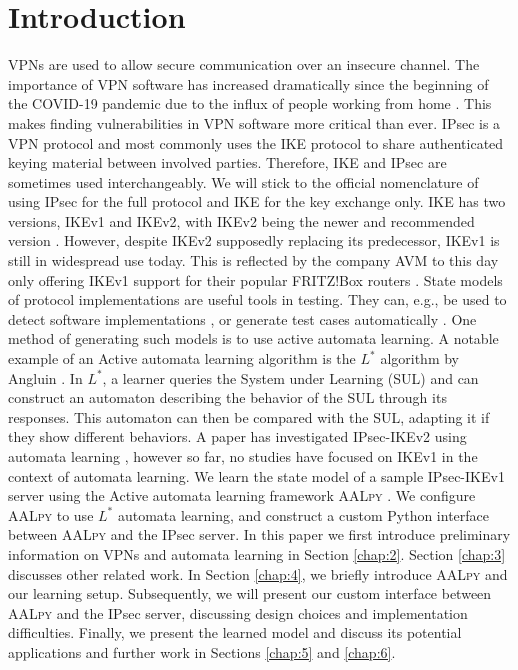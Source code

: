 \documentclass[runningheads]{llncs}
\begin{document}
\section{Introduction}
VPNs are used to allow secure communication over an insecure channel. The importance of VPN software has increased dramatically since the beginning of the COVID-19 pandemic due to the influx of people working from home \cite{abhijith2020impact}. This makes finding vulnerabilities in VPN software more critical than ever. IPsec is a VPN protocol and most commonly uses the IKE protocol to share authenticated keying material between involved parties. Therefore, IKE and IPsec are sometimes used interchangeably. We will stick to the official nomenclature of using IPsec for the full protocol and IKE for the key exchange only. IKE has two versions, IKEv1 and IKEv2, with IKEv2 being the newer and recommended version \cite{nist791491}. However, despite IKEv2 supposedly replacing its predecessor, IKEv1 is still in widespread use today. This is reflected by the company AVM to this day only offering IKEv1 support for their popular FRITZ!Box routers \cite{avm2022}.
State models of protocol implementations are useful tools in testing. They can, e.g., be used to detect software implementations \cite{pferscher2021fingerprinting}, or generate test cases automatically \cite{pferscher2022fuzzing}. One method of generating such models is to use active automata learning. A notable example of an Active automata learning algorithm is the $L^*$ algorithm by Angluin \cite{angluin1987learning}. In $L^*$, a learner queries the System under Learning (SUL) and can construct an automaton describing the behavior of the SUL through its responses. This automaton can then be compared with the SUL, adapting it if they show different behaviors. A paper has investigated IPsec-IKEv2 using automata learning \cite{guo2019model}, however so far, no studies have focused on IKEv1 in the context of automata learning. 
We learn the state model of a sample IPsec-IKEv1 server using the Active automata learning framework \textsc{AALpy} \cite{muvskardin2022AALpy}. We configure \textsc{AALpy} to use $L^*$ automata learning, and construct a custom Python interface between \textsc{AALpy} and the IPsec server.
In this paper we first introduce preliminary information on VPNs and automata learning in Section \ref{chap:2}. Section \ref{chap:3} discusses other related work. In Section \ref{chap:4}, we briefly introduce \textsc{AALpy} and our learning setup. Subsequently, we will present our custom interface between \textsc{AALpy} and the IPsec server, discussing design choices and implementation difficulties. Finally, we present the learned model and discuss its potential applications and further work in Sections \ref{chap:5} and \ref{chap:6}.
\end{document}
